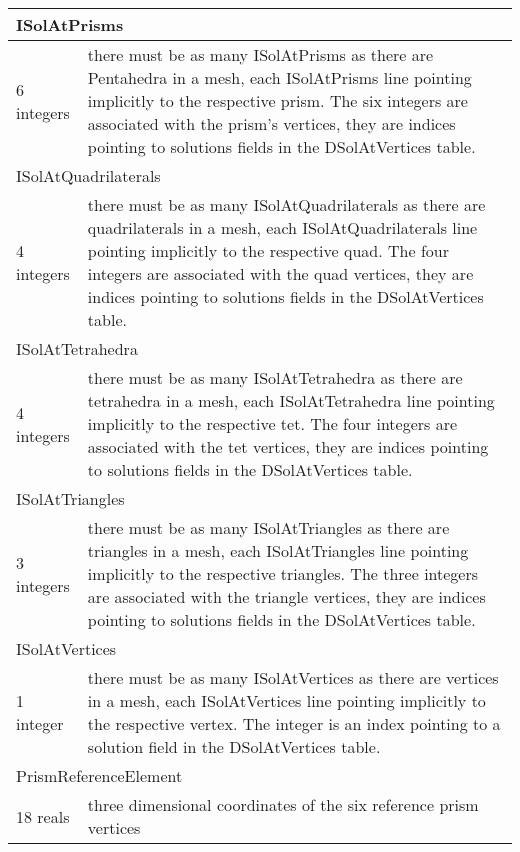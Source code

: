 \documentclass[a4paper,12pt]{article}
\begin{document}
\begin{longtable}{|m{4cm}|m{11cm}|}
\multicolumn{2}{|l|}{ISolAtPrisms} \\
\hline
6 integers & there must be as many ISolAtPrisms as there are Pentahedra in a mesh, each ISolAtPrisms line pointing implicitly to the respective prism. The six integers are associated with the prism's vertices, they are indices pointing to solutions fields in the DSolAtVertices table. \\
\hline\hline

\multicolumn{2}{|l|}{ISolAtQuadrilaterals} \\
\hline
4 integers & there must be as many ISolAtQuadrilaterals as there are quadrilaterals in a mesh, each ISolAtQuadrilaterals line pointing implicitly to the respective quad. The four integers are associated with the quad vertices, they are indices pointing to solutions fields in the DSolAtVertices table. \\
\hline\hline

\multicolumn{2}{|l|}{ISolAtTetrahedra} \\
\hline
4 integers & there must be as many ISolAtTetrahedra as there are tetrahedra in a mesh, each ISolAtTetrahedra line pointing implicitly to the respective tet. The four integers are associated with the tet vertices, they are indices pointing to solutions fields in the DSolAtVertices table. \\
\hline\hline

\multicolumn{2}{|l|}{ISolAtTriangles} \\
\hline
3 integers & there must be as many ISolAtTriangles as there are triangles in a mesh, each ISolAtTriangles line pointing implicitly to the respective triangles. The three integers are associated with the triangle vertices, they are indices pointing to solutions fields in the DSolAtVertices table. \\
\hline\hline

\multicolumn{2}{|l|}{ISolAtVertices} \\
\hline
1 integer & there must be as many ISolAtVertices as there are vertices in a mesh, each ISolAtVertices line pointing implicitly to the respective vertex. The integer is an index pointing to a solution field in the DSolAtVertices table. \\
\hline\hline

\multicolumn{2}{|l|}{PrismReferenceElement} \\
\hline
18 reals & three dimensional coordinates of the six reference prism vertices \\
\hline\hline


\end{longtable}
\end{document}
